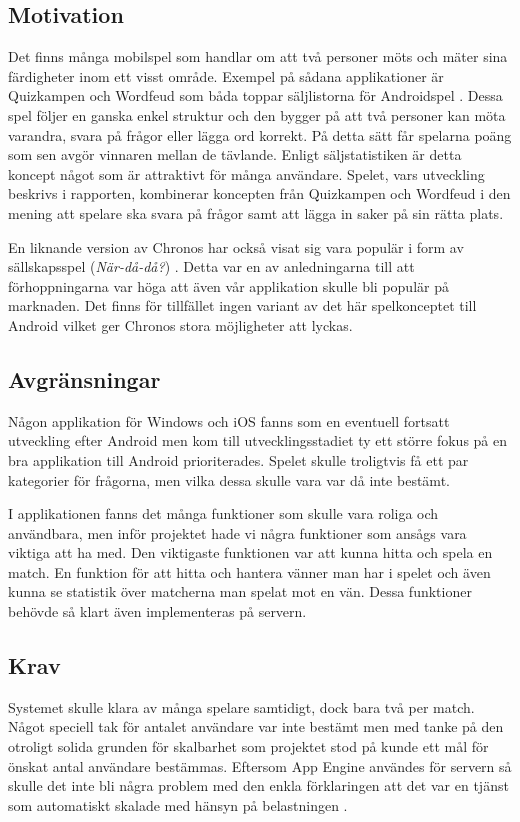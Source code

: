\documentclass[a4paper, 11pt]{article}
\begin{document}
\subsection{Motivation}
Det finns många mobilspel som handlar om att två personer möts och mäter sina färdigheter inom ett visst område. Exempel på sådana applikationer är Quizkampen och Wordfeud som båda toppar säljlistorna för Androidspel \cite{appsalesrating}. Dessa spel följer en ganska enkel struktur och den bygger på att två personer kan möta varandra, svara på frågor eller lägga ord korrekt. På detta sätt får spelarna poäng som sen avgör vinnaren mellan de tävlande. Enligt säljstatistiken \cite{appsalesrating} är detta koncept något som är attraktivt för många användare. Spelet, vars utveckling beskrivs i rapporten, kombinerar koncepten från Quizkampen och Wordfeud i den mening att spelare ska svara på frågor samt att lägga in saker på sin rätta plats. 

En liknande version av Chronos har också visat sig vara populär i form av sällskapsspel (\textit{När-då-då?}) \cite{nardada}. Detta var en av anledningarna till att förhoppningarna var höga att även vår applikation skulle bli populär på marknaden. Det finns för tillfället ingen variant av det här spelkonceptet till Android vilket ger Chronos stora möjligheter att lyckas.

\subsection{Avgränsningar}
Någon applikation för Windows och iOS fanns som en eventuell fortsatt utveckling efter Android men kom till utvecklingsstadiet ty ett större fokus på en bra applikation till Android prioriterades. Spelet skulle troligtvis få ett par kategorier för frågorna, men vilka dessa skulle vara var då inte bestämt. 

I applikationen fanns det många funktioner som skulle vara roliga och användbara, men inför projektet hade vi några funktioner som ansågs vara viktiga att ha med. Den viktigaste funktionen var att kunna hitta och spela en match. En funktion för att hitta och hantera vänner man har i spelet och även kunna se statistik över matcherna man spelat mot en vän. Dessa funktioner behövde så klart även implementeras på servern.

\subsection{Krav}
Systemet skulle klara av många spelare samtidigt, dock bara två per match. Något speciell tak för antalet användare var inte bestämt men med tanke på den otroligt solida grunden för skalbarhet som projektet stod på kunde ett mål för önskat antal användare bestämmas. Eftersom App Engine användes för servern så skulle det inte bli några problem med den enkla förklaringen att det var en tjänst som automatiskt skalade med hänsyn på belastningen \cite{appenginescalability}. 
\end{document}
